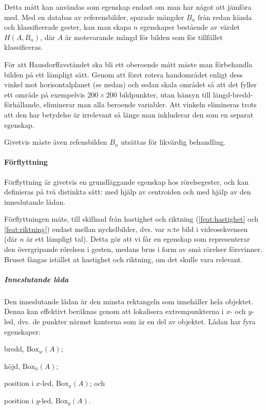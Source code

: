 \documentclass[../rapport_MVEX01-11-05]{subfiles}
\begin{document}
Detta mått kan användas som egenskap endast om man har något att
jämföra med. Med en databas av referensbilder, sparade mängder $B_n$ från redan kända
och klassificerade gester, kan man skapa $n$ egenskaper bestående av
värdet $H(A,B_n)$, där $A$ är motsvarande mängd för bilden som för
tillfället klassificeras.

För att Hausdorffavståndet ska bli ett oberoende mått måste man
förbehandla bilden på ett lämpligt sätt. Genom att först rotera
handområdet enligt dess vinkel mot horisontalplanet (se nedan)
och sedan skala området så att det fyller ett
område på exempelvis $200\times200$ bildpunkter, utan hänsyn till
längd-bredd-förhållande, eliminerar man alla beroende variabler. Att
vinkeln elimineras trots att den har betydelse är irrelevant så länge
man inkluderar den som en separat egenskap.

Givetvis måste även refensbilden $B_n$ utsättas för likvärdig behandling.

\paragraph{Förflyttning}
\label{feat:forflytt}

Förflyttning är givetvis en grundläggande egenskap hos rörelsegester,
och kan definieras på två distinkta sätt: med hjälp av centroiden och
med hjälp av den inneslutande lådan.

Förflyttningen mäts, till skillnad från hastighet och riktning
(\ref{feat:hastighet} och \ref{feat:riktning}) endast mellan
nyckelbilder, dvs. var $n$:te bild i videosekvensen (där $n$ är ett
lämpligt tal). Detta gör att vi får en egenskap som representerar den
övergripande rörelsen i gesten, medans brus i form av små rörelser
försvinner. Bruset fångas istället at hastighet och riktning, om det
skulle vara relevant.

\subparagraph{Inneslutande låda}

Den inneslutande lådan är den minsta rektangeln som innehåller hela
objektet. Denna kan effektivt beräknas genom att lokalisera
extrempunkterna i $x$- och $y$-led, dvs. de punkter närmst kanterna
som är en del av objektet. Lådan har fyra egenskaper:
\begin{inparaenum}[\itshape 1\upshape)]
  \item bredd, $\textrm{Box}_w(A)$;
  \item höjd, $\textrm{Box}_h(A)$;
  \item position i $x$-led, $\textrm{Box}_x(A)$; och
  \item position i $y$-led, $\textrm{Box}_y(A)$.
\end{inparaenum}
\end{document}
